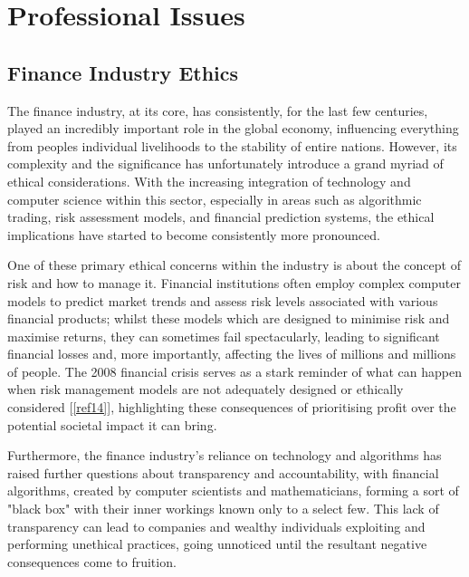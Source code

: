 \documentclass{article}
\begin{document}
\newpage
\section{Professional Issues}

\subsection{Finance Industry Ethics}

The finance industry, at its core, has consistently, for the last few centuries, played an incredibly important role in the global economy, influencing everything from peoples individual livelihoods to the stability of entire nations. However, its complexity and the significance has unfortunately introduce a grand myriad of ethical considerations. With the increasing integration of technology and computer science within this sector, especially in areas such as algorithmic trading, risk assessment models, and financial prediction systems, the ethical implications have started to become consistently more pronounced.\\\vspace{0.3cm}

One of these primary ethical concerns within the industry is about the concept of risk and how to manage it. Financial institutions often employ complex computer models to predict market trends and assess risk levels associated with various financial products; whilst these models which are designed to minimise risk and maximise returns, they can sometimes fail spectacularly, leading to significant financial losses and, more importantly, affecting the lives of millions and millions of people. The 2008 financial crisis serves as a stark reminder of what can happen when risk management models are not adequately designed or ethically considered [\ref{ref14}], highlighting these consequences of prioritising profit over the potential societal impact it can bring.\\\vspace{0.3cm}

Furthermore, the finance industry's reliance on technology and algorithms has raised further questions about transparency and accountability, with financial algorithms, created by computer scientists and mathematicians, forming a sort of "black box" with their inner workings known only to a select few. This lack of transparency can lead to companies and wealthy individuals exploiting and performing unethical practices, going unnoticed until the resultant negative consequences come to fruition.\\\vspace{0.3cm}
\end{document}
